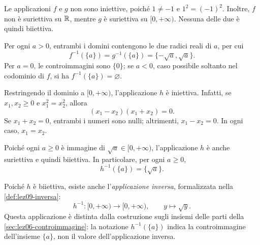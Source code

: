\begin{example}
\label{ex:lez06-quadrato-proprieta}
Le applicazioni \(f\) e \(g\) non sono
iniettive, poiché \(1\ne-1\) e
\(1^2=(-1)^2\). Inoltre, \(f\) non è
suriettiva su \(\mathbb{R}\), mentre \(g\) è
suriettiva su \([0,+\infty)\). Nessuna
delle due è quindi biiettiva.

Per ogni \(a>0\), entrambi i domini
contengono le due radici reali di \(a\),
per cui
\[
  f^{-1}(\{a\})=g^{-1}(\{a\})
  =\{-\sqrt a,\sqrt a\}.
\]
Per \(a=0\), le controimmagini sono
\(\{0\}\); se \(a<0\), caso possibile
soltanto nel codominio di \(f\), si ha
\(f^{-1}(\{a\})=\varnothing\).

Restringendo il dominio a \([0,+\infty)\),
l'applicazione \(h\) è iniettiva.
Infatti, se \(x_1,x_2\ge0\) e
\(x_1^2=x_2^2\), allora
\[
  (x_1-x_2)(x_1+x_2)=0.
\]
Se \(x_1+x_2=0\), entrambi i numeri
sono nulli; altrimenti, \(x_1-x_2=0\).
In ogni caso, \(x_1=x_2\).

Poiché ogni \(a\ge0\) è immagine di
\(\sqrt a\in[0,+\infty)\), l'applicazione
\(h\) è anche suriettiva e quindi biiettiva.
In particolare, per ogni \(a\ge0\),
\[
  h^{-1}(\{a\})=\{\sqrt a\}.
\]
\end{example}

Poiché \(h\) è biiettiva, esiste anche
l'\emph{applicazione inversa}, formalizzata nella
\cref{def:lez09-inversa}:
\[
  h^{-1}\colon[0,+\infty)\longrightarrow[0,+\infty),
  \qquad y\longmapsto\sqrt y.
\]
Questa applicazione è distinta dalla costruzione
sugli insiemi delle parti della
\cref{sec:lez06-controimmagine}: la notazione
\(h^{-1}(\{a\})\) indica la controimmagine
dell'insieme \(\{a\}\), non il valore
dell'applicazione inversa.
